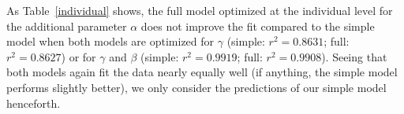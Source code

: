 \documentclass[11pt,a4paper]{article}
\newcommand{\gcs}[1]{\textcolor{blue}{[gcs: #1]}}
\begin{document}
As Table~\ref{individual} shows, the full model optimized at the individual level for the additional parameter $\alpha$ does not improve the fit compared to the simple model when both models are optimized for $\gamma$ (simple: $r^{2}=0.8631$; full: $r^{2}=0.8627$) or for $\gamma$ and $\beta$ (simple: $r^{2}=0.9919$; full: $r^{2}=0.9908$). 
Seeing that both models again fit the data nearly equally well (if anything, the simple model performs slightly better), we only consider the predictions of our simple model henceforth.
%
%
%
%
%
%
%
\end{document}
